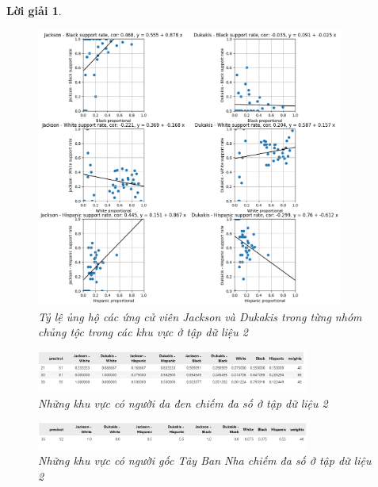 \documentclass[14pt, a4paper]{article}
\theoremstyle{sltheorem}
\theoremstyle{soltheorem}
\newtheorem*{loigiai}{Lời giải}
\begin{document}
\begin{loigiai}
\begin{enumerate}
    \begin{figure}[H]
        \centering
        \includegraphics[width=0.9\textwidth]{figures/race_rate_and_candidate_support_rate.png}
        \caption{Tỷ lệ ủng hộ các ứng cử viên Jackson và Dukakis trong từng nhóm chủng tộc trong các khu vực ở tập dữ liệu 2}
        \label{fig:race_rate_and_candidate_support_rate}
    \end{figure}

    \begin{figure}[H]
        \centering
        \includegraphics[width=0.8\textwidth]{figures/Predominant_black_dataset_2.png}
        \caption{Những khu vực có người da đen chiếm đa số ở tập dữ liệu 2}
        \label{fig:Predominant_black_dataset_2}
    \end{figure}

    \begin{figure}[H]
        \centering
        \includegraphics[width=0.8\textwidth]{figures/Predominant_hispanic_dataset_2.png}
        \caption{Những khu vực có người gốc Tây Ban Nha chiếm đa số ở tập dữ liệu 2}
        \label{fig:Predominant_hispanic_dataset_2}
    \end{figure}


\end{enumerate}
\end{loigiai}
\end{document}
